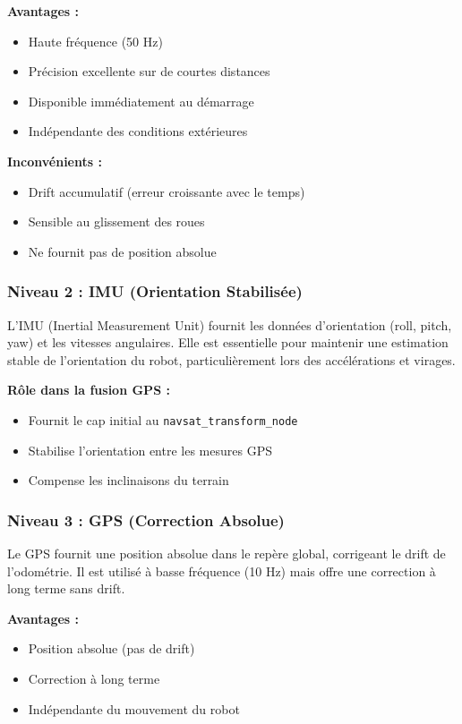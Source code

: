 \documentclass[a4paper,12pt]{article}
\begin{document}
\textbf{Avantages :}
\begin{itemize}
    \item Haute fréquence (50 Hz)
    \item Précision excellente sur de courtes distances
    \item Disponible immédiatement au démarrage
    \item Indépendante des conditions extérieures
\end{itemize}

\textbf{Inconvénients :}
\begin{itemize}
    \item Drift accumulatif (erreur croissante avec le temps)
    \item Sensible au glissement des roues
    \item Ne fournit pas de position absolue
\end{itemize}

\subsubsection{Niveau 2 : IMU (Orientation Stabilisée)}
L'IMU (Inertial Measurement Unit) fournit les données d'orientation (roll, pitch, yaw) et les vitesses angulaires. Elle est essentielle pour maintenir une estimation stable de l'orientation du robot, particulièrement lors des accélérations et virages.

\textbf{Rôle dans la fusion GPS :}
\begin{itemize}
    \item Fournit le cap initial au \texttt{navsat\_transform\_node}
    \item Stabilise l'orientation entre les mesures GPS
    \item Compense les inclinaisons du terrain
\end{itemize}

\subsubsection{Niveau 3 : GPS (Correction Absolue)}
Le GPS fournit une position absolue dans le repère global, corrigeant le drift de l'odométrie. Il est utilisé à basse fréquence (10 Hz) mais offre une correction à long terme sans drift.

\textbf{Avantages :}
\begin{itemize}
    \item Position absolue (pas de drift)
    \item Correction à long terme
    \item Indépendante du mouvement du robot
\end{itemize}
\end{document}
